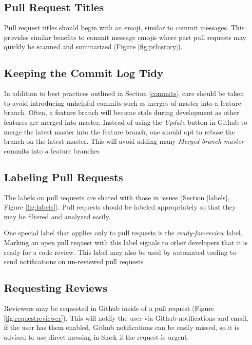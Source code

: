 \documentclass[a4paper,12pt,titlepage]{scrartcl}
\begin{document}
	\subsection{Pull Request Titles}
	
	Pull request titles should begin with an emoji, similar to commit messages.
	This provides similar benefits to commit message emojis where past pull requests may quickly be scanned and summarized (Figure \ref{fig:prhistory}).
	
	\subsection{Keeping the Commit Log Tidy}
	
	In addition to best practices outlined in Section \ref{commits}, care should be taken to avoid introducing unhelpful commits such as merges of master into a feature branch.
	Often, a feature branch will become stale during development as other features are merged into master.
	Instead of using the {\em Update} button in Github to merge the latest master into the feature branch, one should opt to rebase the branch on the latest master.
	This will avoid adding many {\em Merged branch master} commits into a feature branches 
	
	\subsection{Labeling Pull Requests}
	
	The labels on pull requests are shared with those in issues (Section \ref{labels}, Figure \ref{fig:labels}).
	Pull requests should be labeled appropriately so that they may be filtered and analyzed easily.
	
	One special label that applies only to pull requests is the {\em ready-for-review} label.
	Marking an open pull request with this label signals to other developers that it is ready for a code review.
	This label may also be used by automated tooling to send notifications on un-reviewed pull requests
	
	\subsection{Requesting Reviews}
   	
   	Reviewers may be requested in Github inside of a pull request (Figure \ref{fig:requestreviewer}).
   	This will notify the user via Github notifications and email, if the user has them enabled.
   	Github notifications can be easily missed, so it is advised to use direct messing in Slack if the request is urgent.
   	
\end{document}

